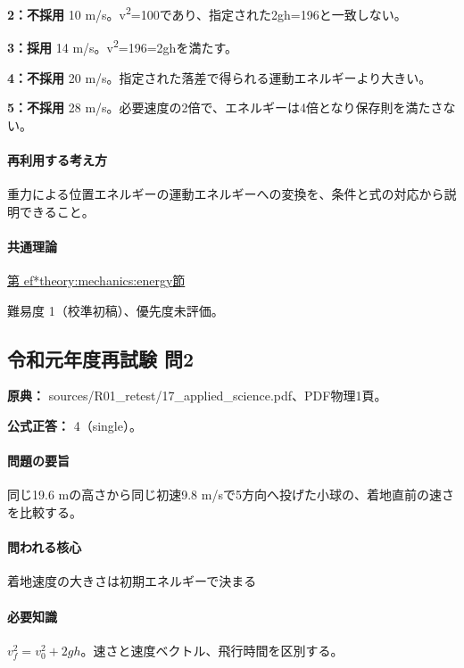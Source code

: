 \noindent\textbf{2：不採用} 10 m/s。v\textsuperscript{2}=100であり、指定された2gh=196と一致しない。\par

\noindent\textbf{3：採用} 14 m/s。v\textsuperscript{2}=196=2ghを満たす。\par

\noindent\textbf{4：不採用} 20 m/s。指定された落差で得られる運動エネルギーより大きい。\par

\noindent\textbf{5：不採用} 28 m/s。必要速度の2倍で、エネルギーは4倍となり保存則を満たさない。\par

\paragraph{再利用する考え方} 重力による位置エネルギーの運動エネルギーへの変換を、条件と式の対応から説明できること。

\paragraph{共通理論} \hyperref[theory:mechanics:energy]{第
ef*{theory:mechanics:energy}節}

\par 難易度 1（校準初稿）、優先度未評価。

\subsection{令和元年度再試験 問2}
\label{q:r01-ret-applied-02}

\noindent\textbf{原典：} sources/R01\_retest/17\_applied\_science.pdf、PDF物理1頁。

\textbf{公式正答：} 4（single）。

\paragraph{問題の要旨} 同じ19.6 mの高さから同じ初速9.8 m/sで5方向へ投げた小球の、着地直前の速さを比較する。

\paragraph{問われる核心} 着地速度の大きさは初期エネルギーで決まる

\paragraph{必要知識} \(v_f^2=v_0^2+2gh\)。速さと速度ベクトル、飛行時間を区別する。


